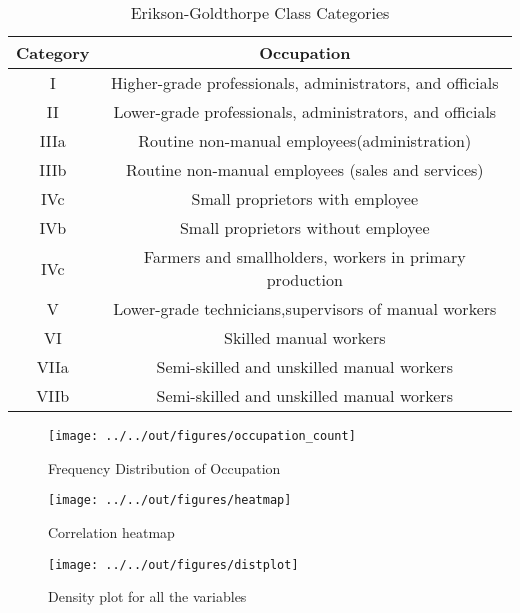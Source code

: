 \documentclass[11pt]{beamer}
\begin{document}
\begin{table}
	\caption{Erikson-Goldthorpe Class Categories }
	\begin{tabular}{| c | c }
 	Category&Occupation   \\
 	\hline
	 I &Higher-grade professionals, administrators, and officials\\

 	II &Lower-grade professionals, administrators, and officials \\

	 IIIa &Routine non-manual employees(administration)\\

 	IIIb& Routine non-manual employees (sales and services) \\
 
	IVc &Small proprietors with employee \\
 
	 IVb &Small proprietors without employee  \\

	IVc& Farmers and smallholders, workers in primary production\\

	V& Lower-grade technicians,supervisors of manual workers\\

	VI& Skilled manual workers\\

	VIIa&Semi-skilled and unskilled manual workers  \\

	VIIb&Semi-skilled and unskilled manual workers \\

	\end{tabular}
\end{table}

\begin{figure}
    \caption{Frequency Distribution of Occupation}
    
    \texttt{[image: ../../out/figures/occupation\_count]}

\end{figure}

\begin{figure}
    \caption{Correlation heatmap}
    
    \texttt{[image: ../../out/figures/heatmap]}

\end{figure}

\begin{figure}
    \caption{Density plot for all the variables}
    
    \texttt{[image: ../../out/figures/distplot]}

\end{figure}
\end{document}
